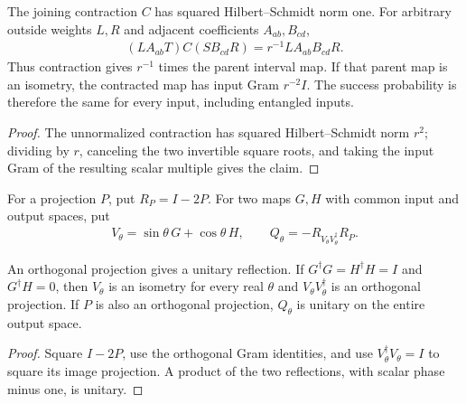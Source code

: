 \begin{lemma}
    \label{thm:mpu_balanced_merger_success_amplitude}
    \leanok
    The joining contraction $C$ has squared Hilbert--Schmidt norm one.
    For arbitrary outside weights $L,R$ and adjacent coefficients
    $A_{ab},B_{cd}$,
    \begin{align}
        (LA_{ab}T)C(SB_{cd}R)=r^{-1}LA_{ab}B_{cd}R.
    \end{align}
    Thus contraction gives $r^{-1}$ times the parent interval map.
    If that parent map is an isometry, the contracted map has input
    Gram $r^{-2}I$. The success probability is therefore the same
    for every input, including entangled inputs.
\end{lemma}
\begin{proof}\leanok
    The unnormalized contraction has squared Hilbert--Schmidt norm
    $r^2$; dividing by $r$, canceling the two invertible square roots,
    and taking the input Gram of the resulting scalar multiple gives the claim.
\end{proof}

\begin{definition}
    \label{def:mpu_exact_subspace_amplification}
    \leanok
    For a projection $P$, put $R_P=I-2P$. For two maps $G,H$
    with common input and output spaces, put
    \begin{align}
        V_\theta=\sin\theta\,G+\cos\theta\,H,
        \qquad Q_\theta=-R_{V_\theta V_\theta^\dagger}R_P.
    \end{align}
\end{definition}

\begin{lemma}
    \label{thm:mpu_amplification_reflections}
    \leanok
    An orthogonal projection gives a unitary reflection.
    If $G^\dagger G=H^\dagger H=I$ and $G^\dagger H=0$, then
    $V_\theta$ is an isometry for every real $\theta$ and
    $V_\theta V_\theta^\dagger$ is an orthogonal projection.
    If $P$ is also an orthogonal projection, $Q_\theta$ is unitary
    on the entire output space.
\end{lemma}
\begin{proof}\leanok
    Square $I-2P$, use the orthogonal Gram identities, and use
    $V_\theta^\dagger V_\theta=I$ to square its image projection.
    A product of the two reflections, with scalar phase minus one,
    is unitary.
\end{proof}

